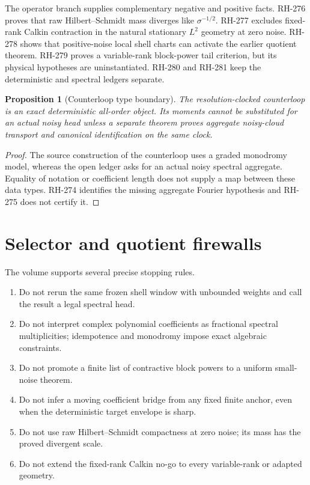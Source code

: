 \documentclass[11pt]{article}
\newtheorem{proposition}[theorem]{Proposition}
\theoremstyle{definition}
\theoremstyle{remark}
\begin{document}
The operator branch supplies complementary negative and positive facts.
RH-276 proves that raw Hilbert--Schmidt mass diverges like
$\sigma^{-1/2}$.  RH-277 excludes fixed-rank Calkin contraction in the
natural stationary $L^2$ geometry at zero noise.  RH-278 shows that
positive-noise local shell charts can activate the earlier quotient theorem.
RH-279 proves a variable-rank block-power tail criterion, but its physical
hypotheses are uninstantiated.  RH-280 and RH-281 keep the deterministic and
spectral ledgers separate.

\begin{proposition}[Counterloop type boundary]
The resolution-clocked counterloop is an exact deterministic all-order
object.  Its moments cannot be substituted for an actual noisy head unless a
separate theorem proves aggregate noisy-cloud transport and canonical
identification on the same clock.
\end{proposition}
\begin{proof}
The source construction of the counterloop uses a graded monodromy model,
whereas the open ledger asks for an actual noisy spectral aggregate.  Equality
of notation or coefficient length does not supply a map between these data
types.  RH-274 identifies the missing aggregate Fourier hypothesis and
RH-275 does not certify it.
\end{proof}

\section{Selector and quotient firewalls}

The volume supports several precise stopping rules.
\begin{enumerate}[leftmargin=2.2em]
\item Do not rerun the same frozen shell window with unbounded weights and
call the result a legal spectral head.
\item Do not interpret complex polynomial coefficients as fractional
spectral multiplicities; idempotence and monodromy impose exact algebraic
constraints.
\item Do not promote a finite list of contractive block powers to a uniform
small-noise theorem.
\item Do not infer a moving coefficient bridge from any fixed finite anchor,
even when the deterministic target envelope is sharp.
\item Do not use raw Hilbert--Schmidt compactness at zero noise; its mass has
the proved divergent scale.
\item Do not extend the fixed-rank Calkin no-go to every variable-rank or
adapted geometry.
\end{enumerate}
\end{document}
